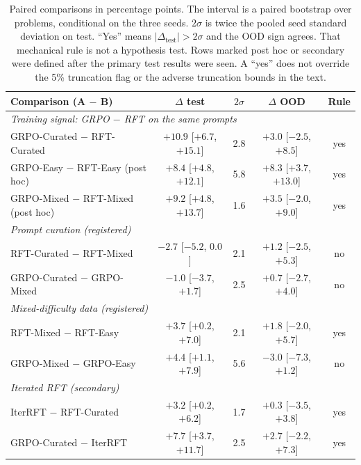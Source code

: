 \begin{table}[t]
\centering
{\small
\begin{tabular}{lcccc}
\toprule
Comparison (A $-$ B) & $\Delta$ test & $2\sigma$ & $\Delta$ OOD & Rule \\
\midrule
\multicolumn{5}{l}{\emph{Training signal: GRPO $-$ RFT on the same prompts}} \\
GRPO-Curated $-$ RFT-Curated & $+10.9$ [$+6.7$, $+15.1$] & 2.8 & $+3.0$ [$-2.5$, $+8.5$] & yes \\
GRPO-Easy $-$ RFT-Easy (post hoc) & $+8.4$ [$+4.8$, $+12.1$] & 5.8 & $+8.3$ [$+3.7$, $+13.0$] & yes \\
GRPO-Mixed $-$ RFT-Mixed (post hoc) & $+9.2$ [$+4.8$, $+13.7$] & 1.6 & $+3.5$ [$-2.0$, $+9.0$] & yes \\
\midrule
\multicolumn{5}{l}{\emph{Prompt curation (registered)}} \\
RFT-Curated $-$ RFT-Mixed & $-2.7$ [$-5.2$, $0.0$] & 2.1 & $+1.2$ [$-2.5$, $+5.3$] & no \\
GRPO-Curated $-$ GRPO-Mixed & $-1.0$ [$-3.7$, $+1.7$] & 2.5 & $+0.7$ [$-2.7$, $+4.0$] & no \\
\midrule
\multicolumn{5}{l}{\emph{Mixed-difficulty data (registered)}} \\
RFT-Mixed $-$ RFT-Easy & $+3.7$ [$+0.2$, $+7.0$] & 2.1 & $+1.8$ [$-2.0$, $+5.7$] & yes \\
GRPO-Mixed $-$ GRPO-Easy & $+4.4$ [$+1.1$, $+7.9$] & 5.6 & $-3.0$ [$-7.3$, $+1.2$] & no \\
\midrule
\multicolumn{5}{l}{\emph{Iterated RFT (secondary)}} \\
IterRFT $-$ RFT-Curated & $+3.2$ [$+0.2$, $+6.2$] & 1.7 & $+0.3$ [$-3.5$, $+3.8$] & yes \\
GRPO-Curated $-$ IterRFT & $+7.7$ [$+3.7$, $+11.7$] & 2.5 & $+2.7$ [$-2.2$, $+7.3$] & yes \\
\bottomrule
\end{tabular}
}
\caption{Paired comparisons in percentage points. The interval is a paired bootstrap over problems, conditional on the three seeds. $2\sigma$ is twice the pooled seed standard deviation on test. ``Yes'' means $|\Delta_{\mathrm{test}}| > 2\sigma$ and the OOD sign agrees. That mechanical rule is not a hypothesis test. Rows marked post hoc or secondary were defined after the primary test results were seen. A ``yes'' does not override the 5\% truncation flag or the adverse truncation bounds in the text.}
\label{tab:contrasts}
\end{table}

